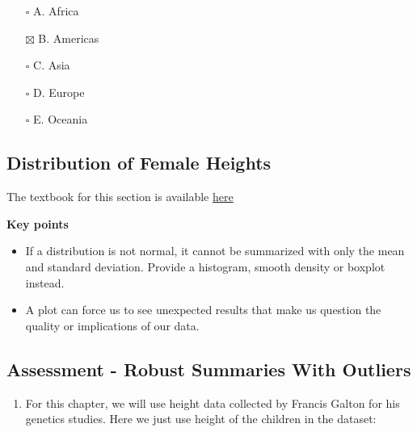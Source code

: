 \documentclass[
]{article}
\newenvironment{Shaded}{\begin{snugshade}}{\end{snugshade}}
\newcommand{\KeywordTok}[1]{\textcolor[rgb]{0.13,0.29,0.53}{\textbf{#1}}}
\newcommand{\NormalTok}[1]{#1}
\newcommand{\OperatorTok}[1]{\textcolor[rgb]{0.81,0.36,0.00}{\textbf{#1}}}
\newcommand{\StringTok}[1]{\textcolor[rgb]{0.31,0.60,0.02}{#1}}
\providecommand{\tightlist}{%
  \setlength{\itemsep}{0pt}\setlength{\parskip}{0pt}}
\begin{document}
\begin{itemize}
\tightlist
\item[$\square$]
  A. Africa
\item[$\boxtimes$]
  B. Americas
\item[$\square$]
  C. Asia
\item[$\square$]
  D. Europe
\item[$\square$]
  E. Oceania
\end{itemize}

\hypertarget{distribution-of-female-heights}{%
\subsection{Distribution of Female
Heights}\label{distribution-of-female-heights}}

The textbook for this section is available
\href{https://rafalab.github.io/dsbook/distributions.html\#student-height-cont}{here}

\textbf{Key points}

\begin{itemize}
\tightlist
\item
  If a distribution is not normal, it cannot be summarized with only the
  mean and standard deviation. Provide a histogram, smooth density or
  boxplot instead.
\item
  A plot can force us to see unexpected results that make us question
  the quality or implications of our data.
\end{itemize}

\hypertarget{assessment---robust-summaries-with-outliers}{%
\subsection{Assessment - Robust Summaries With
Outliers}\label{assessment---robust-summaries-with-outliers}}

\begin{enumerate}
\def\labelenumi{\arabic{enumi}.}
\tightlist
\item
  For this chapter, we will use height data collected by Francis Galton
  for his genetics studies. Here we just use height of the children in
  the dataset:
\end{enumerate}

\begin{Shaded}
\end{Shaded}
\end{document}
